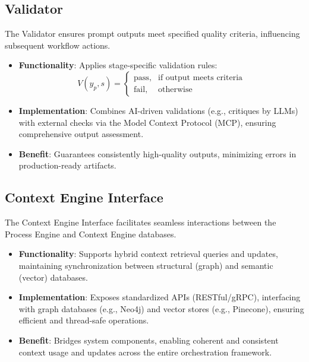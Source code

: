 \documentclass[11pt,a4paper]{article}
\begin{document}
\subsection{Validator}
\label{subsec:validator}

The Validator ensures prompt outputs meet specified quality criteria, influencing subsequent workflow actions.

\begin{itemize}
    \item \textbf{Functionality}:
    Applies stage-specific validation rules:
    \[
    V(y_p, s) = 
    \begin{cases}
        \text{pass}, & \text{if output meets criteria} \\
        \text{fail}, & \text{otherwise}
    \end{cases}
    \]

    \item \textbf{Implementation}:
    Combines AI-driven validations (e.g., critiques by LLMs) with external checks via the Model Context Protocol (MCP), ensuring comprehensive output assessment.

    \item \textbf{Benefit}:
    Guarantees consistently high-quality outputs, minimizing errors in production-ready artifacts.
\end{itemize}

\subsection{Context Engine Interface}
\label{subsec:context_engine_interface}

The Context Engine Interface facilitates seamless interactions between the Process Engine and Context Engine databases.

\begin{itemize}
    \item \textbf{Functionality}:
    Supports hybrid context retrieval queries and updates, maintaining synchronization between structural (graph) and semantic (vector) databases.

    \item \textbf{Implementation}:
    Exposes standardized APIs (RESTful/gRPC), interfacing with graph databases (e.g., Neo4j) and vector stores (e.g., Pinecone), ensuring efficient and thread-safe operations.

    \item \textbf{Benefit}:
    Bridges system components, enabling coherent and consistent context usage and updates across the entire orchestration framework.
\end{itemize}
\end{document}
